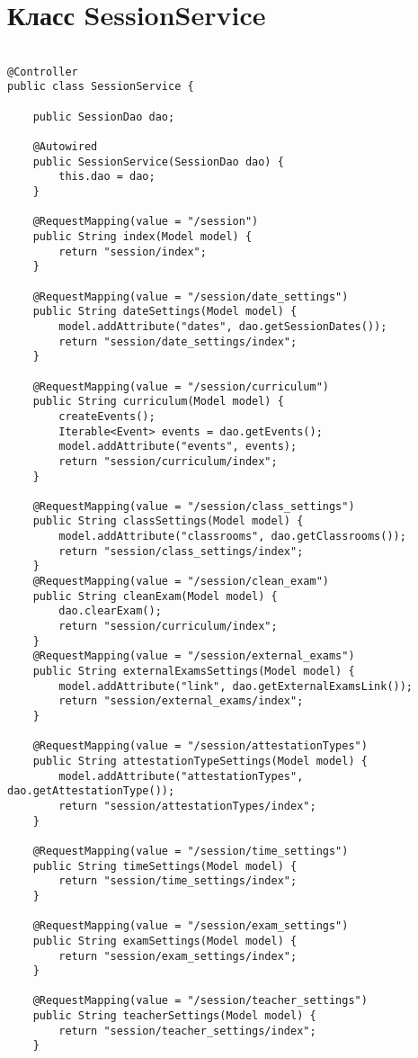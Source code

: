\chapter{Класс SessionService}\label{appendix-session}	

\begin{lstlisting}
	
@Controller
public class SessionService {
	
	public SessionDao dao;
	
	@Autowired
	public SessionService(SessionDao dao) {
		this.dao = dao;
	}
	
	@RequestMapping(value = "/session")
	public String index(Model model) {
		return "session/index";
	}
	
	@RequestMapping(value = "/session/date_settings")
	public String dateSettings(Model model) {
		model.addAttribute("dates", dao.getSessionDates());
		return "session/date_settings/index";
	}
	
	@RequestMapping(value = "/session/curriculum")
	public String curriculum(Model model) {
		createEvents();
		Iterable<Event> events = dao.getEvents();
		model.addAttribute("events", events);
		return "session/curriculum/index";
	}
	
	@RequestMapping(value = "/session/class_settings")
	public String classSettings(Model model) {
		model.addAttribute("classrooms", dao.getClassrooms());
		return "session/class_settings/index";
	}
	@RequestMapping(value = "/session/clean_exam")
	public String cleanExam(Model model) {
		dao.clearExam();
		return "session/curriculum/index";
	}
	@RequestMapping(value = "/session/external_exams")
	public String externalExamsSettings(Model model) {
		model.addAttribute("link", dao.getExternalExamsLink());
		return "session/external_exams/index";
	}
	
	@RequestMapping(value = "/session/attestationTypes")
	public String attestationTypeSettings(Model model) {
		model.addAttribute("attestationTypes", dao.getAttestationType());
		return "session/attestationTypes/index";
	}
	
	@RequestMapping(value = "/session/time_settings")
	public String timeSettings(Model model) {
		return "session/time_settings/index";
	}
	
	@RequestMapping(value = "/session/exam_settings")
	public String examSettings(Model model) {
		return "session/exam_settings/index";
	}
	
	@RequestMapping(value = "/session/teacher_settings")
	public String teacherSettings(Model model) {
		return "session/teacher_settings/index";
	}
	

\end{lstlisting}
